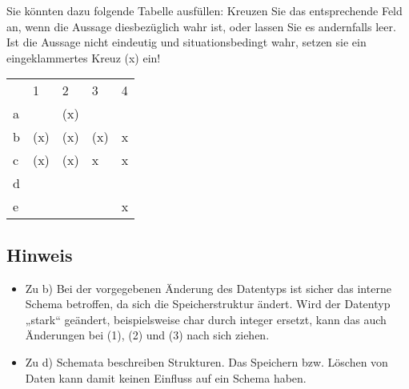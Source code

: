 \documentclass{bschlangaul-aufgabe}
\begin{document}
\noindent
Sie könnten dazu folgende Tabelle ausfüllen: Kreuzen Sie das
entsprechende Feld an, wenn die Aussage diesbezüglich wahr ist, oder
lassen Sie es andernfalls leer. Ist die Aussage nicht eindeutig und
situationsbedingt wahr, setzen sie ein eingeklammertes Kreuz (x) ein!

\begin{liAntwort}
\begin{tabular}{lllll}
  &  1  &  2  & 3   & 4 \\
a &     & (x) &     &   \\
b & (x) & (x) & (x) & x \\
c & (x) & (x) &  x  & x \\
d &     &     &     &   \\
e &     &     &     & x
\end{tabular}

\subsection{Hinweis}

\begin{itemize}
\item Zu b) Bei der vorgegebenen Änderung des Datentyps ist sicher das
interne Schema betroffen, da sich die Speicherstruktur ändert. Wird der
Datentyp „stark“ geändert, \dh beispielsweise char durch integer
ersetzt, kann das auch Änderungen bei (1), (2) und (3) nach sich ziehen.

\item Zu d) Schemata beschreiben Strukturen. Das Speichern bzw. Löschen
von Daten kann damit keinen Einfluss auf ein Schema haben.
\end{itemize}

\end{liAntwort}
\end{document}
